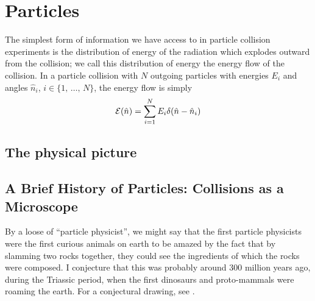 \chapter[Particles]{Particles}






The simplest form of information we have access to in particle collision experiments is the distribution of energy of the radiation which explodes outward from the collision;
%
we call this distribution of energy the energy flow of the collision.
%
In a particle collision with \(N\) outgoing particles with energies \(E_i\) and angles \(\hat n_i\), \(i \in \{1,\,\ldots,\,N\}\), the energy flow is simply
%
\begin{equation}
  \label{eq:energy_flow}
  \mc E(\hat n) = \sum_{i=1}^N E_i \delta(\hat n - \hat n_i)
\end{equation}



\section{The physical picture}



\section{A Brief History of Particles: Collisions as a Microscope}


By a loose of ``particle physicist'', we might say that the first particle physicists were the first curious animals on earth to be amazed by the fact that by slamming two rocks together, they could see the ingredients of which the rocks were composed.
%
I conjecture that this was probably around 300 million years ago, during the Triassic period, when the first dinosaurs and proto-mammals were roaming the earth.
%
For a conjectural drawing, see .


